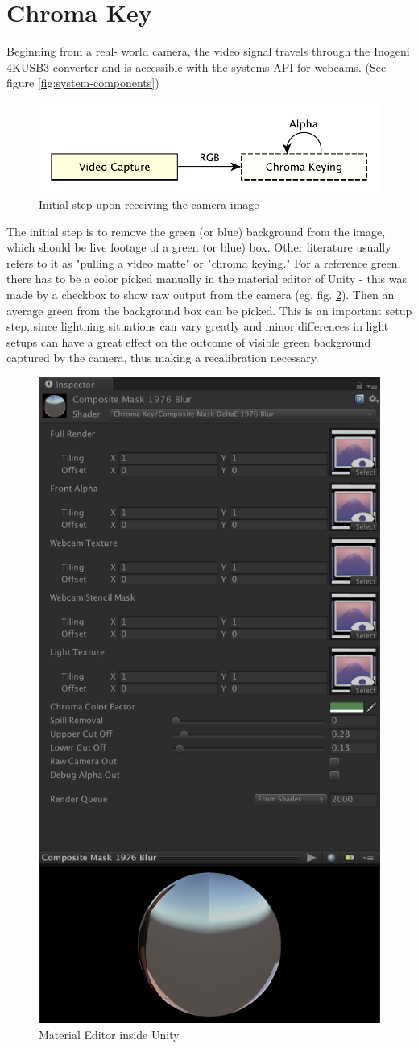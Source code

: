 %
\section{Chroma Key}
\label{sec:chromakey}

Beginning from a real-
world camera, the video signal travels through the 
Inogeni 4KUSB3 converter and is accessible with the systems API for webcams. 
(See figure \ref{fig:system-components})

\begin{figure}[htb]
	\centering
	\includegraphics[width=.7\textwidth]{_raw_resources/pipeline_steps/4_1_chroma.pdf}
	\caption{Initial step upon receiving the camera image}
	\label{fig:steps:chroma}
\end{figure}

The initial step is to remove the green (or blue) background from the image, 
which should be live footage of a green (or blue) box. Other literature usually 
refers to it as "pulling a video matte" or "chroma keying." For a reference 
green, there has to be a color picked manually in the material editor of Unity 
- this was made by a checkbox to show raw output from the camera (eg. fig. 
\ref{fig:chroma:editor}). Then an average green from the background box can be 
picked. This is an important setup step, since lightning situations can vary 
greatly and minor differences in light setups can have a great effect on the 
outcome of visible green background captured by the camera, thus making a 
recalibration necessary.

\begin{figure}[htb]
	\centering
	\includegraphics[width=.45\textwidth]{gfx/distances/material-editor.png}
	\caption{Material Editor inside Unity}
	\label{fig:chroma:editor}
\end{figure}


